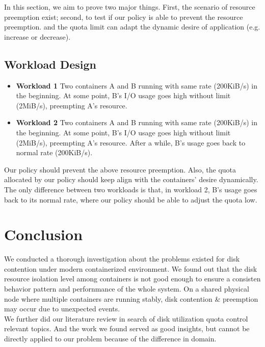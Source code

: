 \documentclass[10pt, conference,compsoc]{IEEEtran}
\begin{document}
In this section, we aim to prove two major things. First, the scenario of resource preemption exist; second, to test if our policy is able to prevent the resource preemption.
and the quota limit can adapt the dynamic desire of application (e.g. increase or decrease).

\subsection{Workload Design}

\begin{itemize}
  \item \textbf{Workload 1} Two containers A and B running with same rate (200KiB/s) in the beginning. At some point, B's I/O usage goes high without limit (2MiB/s), preempting A's resource.
  \item \textbf{Workload 2} Two containers A and B running with same rate (200KiB/s) in the beginning. At some point, B's I/O usage goes high without limit (2MiB/s), preempting A's resource. After a while, B's usage goes back to normal rate (200KiB/s).
\end{itemize}

Our policy should prevent the above resource preemption. Also, the quota allocated by our policy should keep align with the containers' desire dynamically. The only difference between two workloads is that, in workload 2, B's usage goes back to its normal rate, where our policy should be able to adjust the quota low. \\



\section{Conclusion}
We conducted a thorough investigation about the problems existed for disk contention under modern containerized environment. We found out that the disk resource isolation level among containers is not good enough to ensure a consisten behavior pattern and perfornmance of the whole system. On a shared physical node where multiple containers are running stably, disk contention \& preemption may occur due to unexpected events.\\

We further did our literature review in search of disk utilization quota control relevant topics. And the work we found served as good insights, but cannot be directly applied to our problem because of the difference in domain. \\
\end{document}
